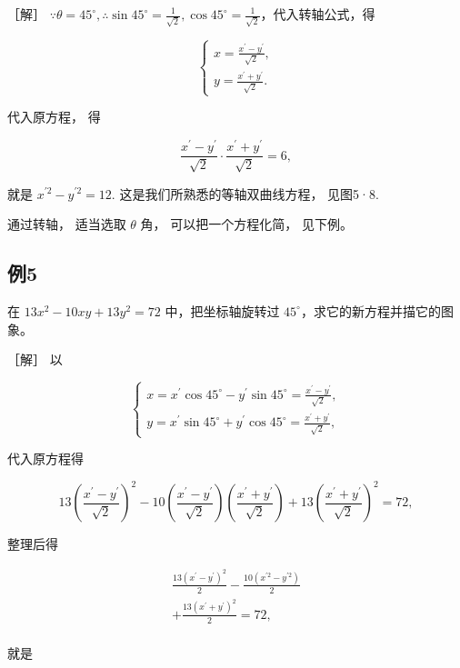 ［解］
\(\because \theta = 45^{\circ}, \therefore \sin 45^{\circ} = \frac{1}{\sqrt{2}}, \cos 45^{\circ} = \frac{1}{\sqrt{2}}\)，代入转轴公式，得

\[
\left\{ \begin{array}{l} x = \frac {x^{\prime} - y^{\prime}}{\sqrt {2}}, \\ y = \frac {x^{\prime} + y^{\prime}}{\sqrt {2}}. \end{array} \right.
\]

代入原方程， 得

\[
\frac {x^{\prime} - y^{\prime}}{\sqrt {2}} \cdot \frac {x^{\prime} + y^{\prime}}{\sqrt {2}} = 6,
\]

就是 \(x^{\prime 2} - y^{\prime 2} = 12.\)
这是我们所熟悉的等轴双曲线方程， 见图5·8.

通过转轴， 适当选取 \(\theta\) 角， 可以把一个方程化简， 见下例。

\subsection{例5}\label{ux4f8b5-10}

在 \(13x^{2}-10xy+13y^{2}=72\) 中，把坐标轴旋转过
\(45^{\circ}\)，求它的新方程并描它的图象。

［解］ 以

\[
\left\{ \begin{array}{l} x = x^{\prime} \cos 45^{\circ} - y^{\prime} \sin 45^{\circ} = \frac {x^{\prime} - y^{\prime}}{\sqrt {2}}, \\ y = x^{\prime} \sin 45^{\circ} + y^{\prime} \cos 45^{\circ} = \frac {x^{\prime} + y^{\prime}}{\sqrt {2}}, \end{array} \right. \tag {1}
\]

代入原方程得

\[
13 \left(\frac {x^{\prime} - y^{\prime}}{\sqrt {2}}\right) ^ {2} - 10 \left(\frac {x^{\prime} - y^{\prime}}{\sqrt {2}}\right) \left(\frac {x^{\prime} + y^{\prime}}{\sqrt {2}}\right) + 13 \left(\frac {x^{\prime} + y^{\prime}}{\sqrt {2}}\right) ^ {2} = 72,
\]

整理后得

\[
\begin{array}{l} \frac {13 (x^{\prime} - y^{\prime}) ^ {2}}{2} - \frac {10 (x^{\prime 2} - y^{\prime 2})}{2} \\ + \frac {13 (x^{\prime} + y^{\prime}) ^ {2}}{2} = 72, \tag {2} \\ \end{array}
\]

就是

